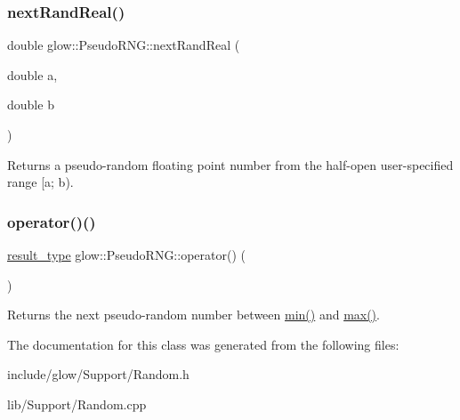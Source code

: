 \subsubsection{\texorpdfstring{next\+Rand\+Real()}{nextRandReal()}}
{\footnotesize\ttfamily double glow\+::\+Pseudo\+R\+N\+G\+::next\+Rand\+Real (\begin{DoxyParamCaption}\item[{double}]{a,  }\item[{double}]{b }\end{DoxyParamCaption})}

\begin{DoxyReturn}{Returns}
a pseudo-\/random floating point number from the half-\/open user-\/specified range \mbox{[}a; b). 
\end{DoxyReturn}
\mbox{\label{classglow_1_1_pseudo_r_n_g_a05c49b1dc4d64572e91bbc08a489d965}} 
\subsubsection{\texorpdfstring{operator()()}{operator()()}}
{\footnotesize\ttfamily \hyperlink{classglow_1_1_pseudo_r_n_g_a3fe973c9dca35c5b572da3ed711df069}{result\+\_\+type} glow\+::\+Pseudo\+R\+N\+G\+::operator() (\begin{DoxyParamCaption}{ }\end{DoxyParamCaption})\hspace{0.3cm}{\ttfamily [inline]}}

\begin{DoxyReturn}{Returns}
the next pseudo-\/random number between \hyperlink{classglow_1_1_pseudo_r_n_g_a3bd34021eb9345528df795dd66f3181a}{min()} and \hyperlink{classglow_1_1_pseudo_r_n_g_aa98bf022462ca4fc96382a67d1800a0d}{max()}. 
\end{DoxyReturn}


The documentation for this class was generated from the following files\+:\begin{DoxyCompactItemize}
\item 
include/glow/\+Support/Random.\+h\item 
lib/\+Support/Random.\+cpp\end{DoxyCompactItemize}
